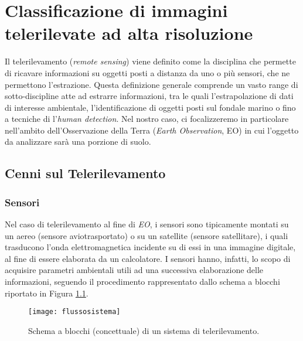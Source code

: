 
\chapter{Classificazione di immagini telerilevate ad alta risoluzione} 
\label{cap:telerilevamento} 

Il telerilevamento (\emph{remote sensing}) viene definito come la disciplina che permette di ricavare informazioni su oggetti posti a distanza da uno o più sensori, che ne permettono l'estrazione. 
Questa definizione generale comprende un vasto range di sotto-discipline atte ad estrarre informazioni, tra le quali l'estrapolazione di dati di interesse ambientale, l'identificazione di oggetti posti sul fondale marino o fino a tecniche di l'\emph{human detection}.
Nel nostro caso, ci focalizzeremo in particolare nell'ambito dell'Osservazione della Terra (\emph{Earth Observation}, EO) in cui l'oggetto da analizzare sarà una porzione di suolo.
\clearpage


\section{Cenni sul Telerilevamento}


\subsection{Sensori}
Nel caso di telerilevamento al fine di \emph{EO}, i sensori sono tipicamente montati su un aereo (sensore aviotrasportato) o su un satellite (sensore satellitare), i quali trasducono l'onda elettromagnetica incidente su di essi in una immagine digitale, al fine di essere elaborata da un calcolatore. 
I sensori hanno, infatti, lo scopo di acquisire parametri ambientali utili ad una successiva elaborazione delle informazioni, seguendo il procedimento rappresentato dallo schema a blocchi riportato in Figura \ref{fig:flussosistema}.

\begin{figure}[!ht]
\texttt{[image: flussosistema]}
\caption{Schema a blocchi (concettuale) di un sistema di telerilevamento.}
\label{fig:flussosistema}
\end{figure}

